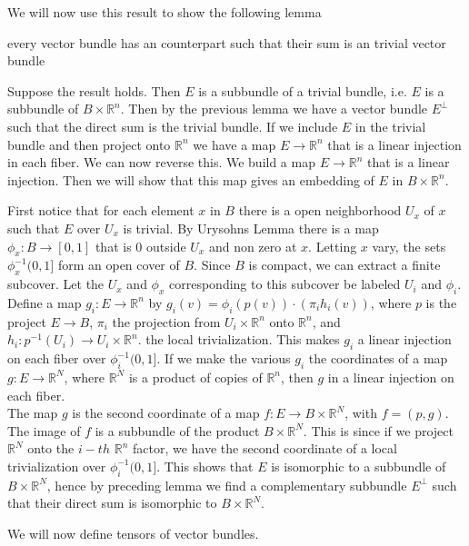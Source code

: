 \documentclass[../Thesis.tex]{subfiles}
\begin{document}
We will now use this result to show the following lemma
\begin{lemma}
every vector bundle has an counterpart such that their sum is an trivial vector bundle
\end{lemma}
Suppose the result holds. Then $E$ is a subbundle of a trivial bundle, i.e. $E$ is a subbundle of $B \times \mathbb{R}^n$. Then by the previous lemma we have a vector bundle $E^\perp$ such that the direct sum is the trivial bundle. If we include $E$ in the trivial bundle and then project onto $\mathbb{R}^n$ we have a map $E \rightarrow \mathbb{R}^n$ that is a linear injection in each fiber. We can now reverse this. We build a map $E \rightarrow \mathbb{R}^n$ that is a linear injection. Then we will show that this map gives an embedding of $E$ in $B \times \mathbb{R}^n$.
\begin{myproof}
First notice that for each element $x$ in $B$ there is a open neighborhood $U_x$ of $x$ such that $E$ over $U_x$ is trivial. By Urysohns Lemma there is a map $\phi_x: B \rightarrow [0,1]$ that is $0$ outside $U_x$ and non zero at $x$. Letting $x$ vary, the sets $\phi_x^{-1}(0,1]$ form an open cover of $B$. Since $B$ is compact, we can extract a finite subcover. Let the $U_x$ and $\phi_x$ corresponding to this subcover be labeled $U_i$ and $\phi_i$. Define a map $g_i : E \rightarrow \mathbb{R}^n$ by $g_i(v) = \phi_i(p(v)) \cdot (\pi_i h_i(v))$, where $p$ is the project $E \rightarrow B$, $\pi_i$ the projection
from $U_i \times \mathbb{R}^n$ onto $\mathbb{R}^n$, and $h_i : p^{-1}(U_i) \rightarrow U_i \times \mathbb{R}^n$. the local trivialization. This makes $g_i$ a linear injection on each fiber over $\phi_i^{-1}(0,1]$. If we make the various $g_i$ the coordinates of a map $g : E \rightarrow \mathbb{R}^N$, where $\mathbb{R}^N$ is a product of copies of $\mathbb{R}^n$, then $g$ in a linear injection on each fiber.
\\The map $g$ is the second coordinate of a map $f : E \rightarrow B \times \mathbb{R}^N$, with $f = (p, g)$. The image of $f$ is a subbundle of the product $B \times \mathbb{R}^N$. This is since if we project $\mathbb{R}^N$ onto the $i-th$ $\mathbb{R}^n$ factor, we have the second coordinate of a local trivialization over $\phi_i^{-1}(0,1]$. This shows that $E$ is isomorphic to a subbundle of $B \times \mathbb{R}^N$, hence by preceding lemma we find a complementary subbundle $E^\perp$ such that their direct sum is isomorphic to $B \times \mathbb{R}^N$.
\end{myproof}
We will now define tensors of vector bundles.
\end{document}
